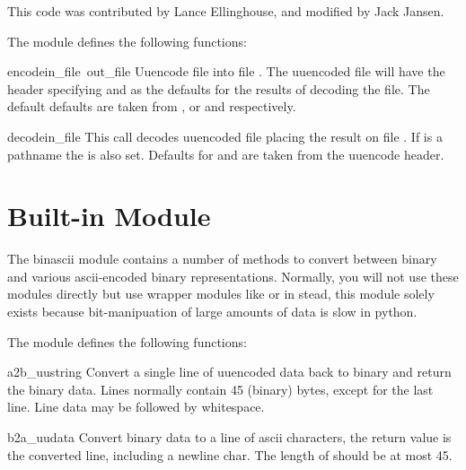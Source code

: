 This code was contributed by Lance Ellinghouse, and modified by Jack
Jansen.

The  module defines the following functions:


\begin{funcdesc}{encode}{in_file\, out_file}
Uuencode file  into file .  The uuencoded
file will have the header specifying  and  as the
defaults for the results of decoding the file. The default defaults
are taken from , or  and 
respectively. 
\end{funcdesc}

\begin{funcdesc}{decode}{in_file}
This call decodes uuencoded file  placing the result on
file . If  is a pathname the  is
also set. Defaults for  and  are taken from
the uuencode header.
\end{funcdesc}

\section{Built-in Module }	%

The binascii module contains a number of methods to convert between
binary and various ascii-encoded binary representations. Normally, you
will not use these modules directly but use wrapper modules like
 or  in stead, this module solely exists because
bit-manipuation of large amounts of data is slow in python.

The  module defines the following functions:


\begin{funcdesc}{a2b_uu}{string}
Convert a single line of uuencoded data back to binary and return the
binary data. Lines normally contain 45 (binary) bytes, except for the
last line. Line data may be followed by whitespace.
\end{funcdesc}

\begin{funcdesc}{b2a_uu}{data}
Convert binary data to a line of ascii characters, the return value is
the converted line, including a newline char. The length of 
should be at most 45.
\end{funcdesc}

